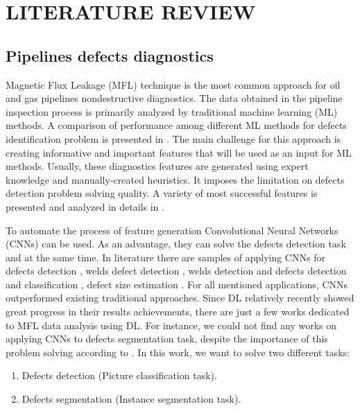 \section{LITERATURE REVIEW}
\label{LITERATURE REVIEW}

\subsection{Pipelines defects diagnostics}

Magnetic Flux Leakage (MFL) technique is the most common approach for oil and gas pipelines nondestructive diagnostics.
The data obtained in the pipeline inspection process is primarily analyzed by traditional machine learning (ML) methods.
A comparison of performance among different ML methods for defects identification problem is presented in \cite{Khodayari-Rostamabad2009}.
The main challenge for this approach is creating informative and important features that will be used as an input for ML methods.
Usually, these diagnostics features are generated using expert knowledge and manually-created heuristics.
It imposes the limitation on defects detection problem solving quality.
A variety of most successful features is presented and analyzed in details in \cite{Slesarev2017}.

To automate the process of feature generation Convolutional Neural Networks (CNNs) can be used.
As an advantage, they can solve the defects detection task and at the same time.
In literature there are samples of applying CNNs for defects detection \cite{Feng2017}, welds defect detection \cite{2020a}, welds detection and defects detection and classification \cite{Yang2020}, defect size estimation \cite{Lu2019}.
For all mentioned applications, CNNs outperformed existing traditional approaches.
Since DL relatively recently showed great progress in their results achievements, there are just a few works dedicated to MFL data analysis using DL.
For instance, we could not find any works on applying CNNs to defects segmentation task, despite the importance of this problem solving according to \cite{Feng2017}.
In this work, we want to solve two different tasks:
\begin{enumerate}
	\item Defects detection (Picture classification task).
	\item Defects segmentation (Instance segmentation task).
\end{enumerate}
